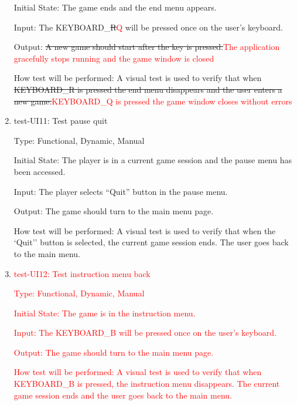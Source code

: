 \documentclass[12pt, titlepage]{article}
\begin{document}
\begin{enumerate}
Initial State: The game ends and the end menu appears.
					
Input: The KEYBOARD\_\sout{R}\textcolor{red}{Q} will be pressed once on the user's keyboard.
					
Output: \sout{A new game should start after the key is pressed.}\textcolor{red}{The application gracefully stops running and the game window is closed}
					
How test will be performed: A visual test is used to verify that when \sout{KEYBOARD\_R is pressed the end menu disappears and the user enters a new game.}\textcolor{red}{KEYBOARD\_Q is pressed the game window closes without errors}	

\item{test-UI11: Test pause quit\\}

Type: Functional, Dynamic, Manual
					
Initial State: The player is in a current game session and the pause menu has been accessed.
					
Input: The player selects ``Quit'' button in the pause menu.
					
Output: The game should turn to the main menu page.
					
How test will be performed: A visual test is used to verify that when the `Quit'' button is selected, the current game session ends. The user goes back to the main menu.	

\item{\textcolor{red}{test-UI12: Test instruction menu back\\}}

\textcolor{red}{Type: Functional, Dynamic, Manual}
					
\textcolor{red}{Initial State: The game is in the instruction menu.}
					
\textcolor{red}{Input: The KEYBOARD\_B will be pressed once on the user's keyboard.}
					
\textcolor{red}{Output: The game should turn to the main menu page.}
					
\textcolor{red}{How test will be performed: A visual test is used to verify that when KEYBOARD\_B is pressed, the instruction menu disappears. The current game session ends and the user goes back to the main menu.}
\end{enumerate}
\end{document}
